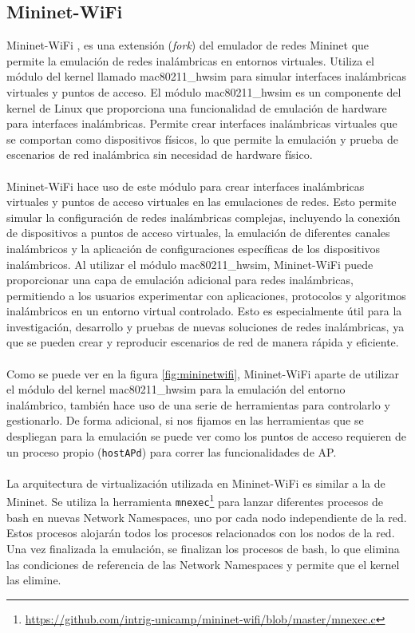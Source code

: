 \subsection{Mininet-WiFi}
\label{subsec:mininetWIFIS}
Mininet-WiFi \cite{7367387}, es una extensión (\textit{fork}) del emulador de redes Mininet que permite la emulación de redes inalámbricas en entornos virtuales. Utiliza el módulo del kernel llamado mac80211\_hwsim para simular interfaces inalámbricas virtuales y puntos de acceso. El módulo mac80211\_hwsim es un componente del kernel de Linux que proporciona una funcionalidad de emulación de hardware para interfaces inalámbricas. Permite crear interfaces inalámbricas virtuales que se comportan como dispositivos físicos, lo que permite la emulación y prueba de escenarios de red inalámbrica sin necesidad de hardware físico.\\
\\
Mininet-WiFi hace uso de este módulo para crear interfaces inalámbricas virtuales y puntos de acceso virtuales en las emulaciones de redes. Esto permite simular la configuración de redes inalámbricas complejas, incluyendo la conexión de dispositivos a puntos de acceso virtuales, la emulación de diferentes canales inalámbricos y la aplicación de configuraciones específicas de los dispositivos inalámbricos. Al utilizar el módulo mac80211\_hwsim, Mininet-WiFi puede proporcionar una capa de emulación adicional para redes inalámbricas, permitiendo a los usuarios experimentar con aplicaciones, protocolos y algoritmos inalámbricos en un entorno virtual controlado. Esto es especialmente útil para la investigación, desarrollo y pruebas de nuevas soluciones de redes inalámbricas, ya que se pueden crear y reproducir escenarios de red de manera rápida y eficiente.\\
\\
Como se puede ver en la figura \ref{fig:mininetwifi}, Mininet-WiFi aparte de utilizar el módulo del kernel mac80211\_hwsim para la emulación del entorno inalámbrico, también hace uso de una serie de herramientas para controlarlo y gestionarlo. De forma adicional, si nos fijamos en las herramientas que se despliegan para la emulación se puede ver como los puntos de acceso requieren de un proceso propio (\texttt{hostAPd}) para correr las funcionalidades de AP.\\
\\
La arquitectura de virtualización utilizada en Mininet-WiFi es similar a la de Mininet. Se utiliza la herramienta \texttt{mnexec}\footnote{\url{https://github.com/intrig-unicamp/mininet-wifi/blob/master/mnexec.c}} para lanzar diferentes procesos de bash en nuevas Network Namespaces, uno por cada nodo independiente de la red. Estos procesos alojarán todos los procesos relacionados con los nodos de la red. Una vez finalizada la emulación, se finalizan los procesos de bash, lo que elimina las condiciones de referencia de las Network Namespaces y permite que el kernel las elimine.\\
